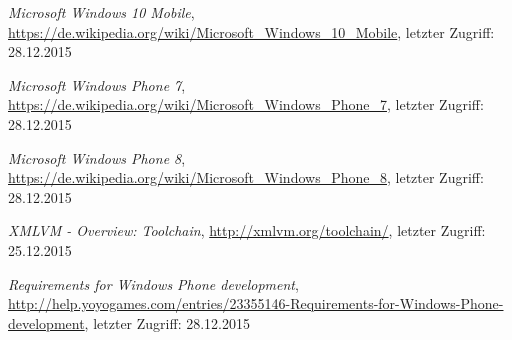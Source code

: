 \begin{thebibliography}{}
\emph{Microsoft Windows 10 Mobile},
\url{https://de.wikipedia.org/wiki/Microsoft_Windows_10_Mobile}, letzter Zugriff: 28.12.2015

\emph{Microsoft Windows Phone 7},
\url{https://de.wikipedia.org/wiki/Microsoft_Windows_Phone_7}, letzter Zugriff: 28.12.2015

\emph{Microsoft Windows Phone 8},
\url{https://de.wikipedia.org/wiki/Microsoft_Windows_Phone_8}, letzter Zugriff: 28.12.2015

\emph{XMLVM - Overview: Toolchain},
\url{http://xmlvm.org/toolchain/}, letzter Zugriff: 25.12.2015

\emph{Requirements for Windows Phone development},
\url{http://help.yoyogames.com/entries/23355146-Requirements-for-Windows-Phone-development}, letzter Zugriff: 28.12.2015


\end{thebibliography}
\clearpage\thispagestyle{empty}
\eigen  %
